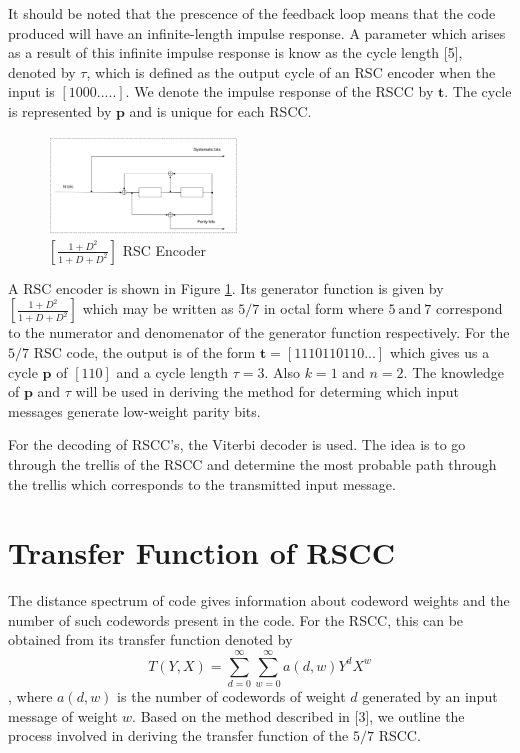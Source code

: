 \documentclass[conference]{IEEEtran}
\begin{document}
It should be noted that the prescence of the feedback loop means that the code produced will have an infinite-length impulse response. A parameter which arises as a result of this infinite impulse response is know as the cycle length  [5], denoted by $\tau$, which is defined as the output cycle of an RSC encoder when the input is $[1 0 0 0 .....]$. We denote the impulse response of the RSCC by $\textbf{t}$.
 The cycle is represented by $\textbf{p}$ and is unique for each RSCC. 

\begin{figure}[h]
\centering
		\includegraphics[width=0.45\textwidth]{RSCExample3.pdf}
		\caption{$[\frac{1+D^2}{1+D+D^2}]$  RSC Encoder}
		\label{fig1}
		\end{figure}
		
A RSC encoder is shown in Figure \ref{fig1}. Its generator function is given by $[\frac{1+D^2}{1+D+D^2}]$ which may be written as $5/7$ in octal form where $5 ~ \text{and} ~ 7$ correspond to the numerator and denomenator of the generator function respectively. 
 For the $5/7$ RSC code, the output is of the form $\textbf{t}=[1 1 1 0 1 1 0 1 1 0 ...]$ which gives us a cycle $\textbf{p}$ of $[1 1 0]$ and a cycle length $\tau =3$. Also $k=1$ and $n=2$. The knowledge of $\textbf{p}$ and $\tau$ will be used in deriving the method for determing which input messages generate low-weight parity bits. 
 
For the decoding of RSCC's, the Viterbi decoder is used. The idea is to go through the trellis of the RSCC and determine the most probable path through the trellis which corresponds to the transmitted input message.

\section{Transfer Function of RSCC}
\label{sec3}
The distance spectrum of code gives information about codeword weights and the number of such codewords present in the code. For the RSCC, this can be obtained from its transfer function denoted by $$T(Y,X)=\sum_{d=0}^{\infty}\sum_{w=0}^{\infty} a(d,w)Y^dX^w$$,  where $a(d,w)$ is the number of codewords of weight $d$ generated by an input message of weight $w$.
Based on the method described in [3], we outline the process involved in deriving the transfer function of the $5/7$ RSCC. 
\end{document}
